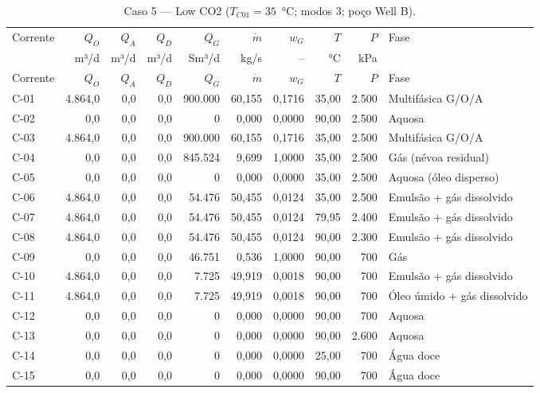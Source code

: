 \documentclass[11pt,a4paper]{article}
\numberwithin{equation}{section}
\numberwithin{table}{section}
\numberwithin{figure}{section}
\begin{document}
{\footnotesize\setlength{\tabcolsep}{3pt}\begin{longtable}{lrrrrrrrrL{2.5cm}}
\caption{Caso 5 --- Low CO2 ($T_{C01}=35$~°C; modos 3; poço Well B).}\\\toprule
Corrente & $Q_O$ & $Q_A$ & $Q_D$ & $Q_G$ & $\dot m$ & $w_G$ & $T$ & $P$ & Fase\\ & m³/d & m³/d & m³/d & Sm³/d & kg/s & -- & °C & kPa & \\\midrule\endfirsthead
\toprule Corrente & $Q_O$ & $Q_A$ & $Q_D$ & $Q_G$ & $\dot m$ & $w_G$ & $T$ & $P$ & Fase\\\midrule\endhead
C-01 & 4.864,0 & 0,0 & 0,0 & 900.000 & 60,155 & 0,1716 & 35,00 & 2.500 & {\scriptsize Multifásica G/O/A}\\
C-02 & 0,0 & 0,0 & 0,0 & 0 & 0,000 & 0,0000 & 90,00 & 2.500 & {\scriptsize Aquosa}\\
C-03 & 4.864,0 & 0,0 & 0,0 & 900.000 & 60,155 & 0,1716 & 35,00 & 2.500 & {\scriptsize Multifásica G/O/A}\\
C-04 & 0,0 & 0,0 & 0,0 & 845.524 & 9,699 & 1,0000 & 35,00 & 2.500 & {\scriptsize Gás (névoa residual)}\\
C-05 & 0,0 & 0,0 & 0,0 & 0 & 0,000 & 0,0000 & 35,00 & 2.500 & {\scriptsize Aquosa (óleo disperso)}\\
C-06 & 4.864,0 & 0,0 & 0,0 & 54.476 & 50,455 & 0,0124 & 35,00 & 2.500 & {\scriptsize Emulsão + gás dissolvido}\\
C-07 & 4.864,0 & 0,0 & 0,0 & 54.476 & 50,455 & 0,0124 & 79,95 & 2.400 & {\scriptsize Emulsão + gás dissolvido}\\
C-08 & 4.864,0 & 0,0 & 0,0 & 54.476 & 50,455 & 0,0124 & 90,00 & 2.300 & {\scriptsize Emulsão + gás dissolvido}\\
C-09 & 0,0 & 0,0 & 0,0 & 46.751 & 0,536 & 1,0000 & 90,00 & 700 & {\scriptsize Gás}\\
C-10 & 4.864,0 & 0,0 & 0,0 & 7.725 & 49,919 & 0,0018 & 90,00 & 700 & {\scriptsize Emulsão + gás dissolvido}\\
C-11 & 4.864,0 & 0,0 & 0,0 & 7.725 & 49,919 & 0,0018 & 90,00 & 700 & {\scriptsize Óleo úmido + gás dissolvido}\\
C-12 & 0,0 & 0,0 & 0,0 & 0 & 0,000 & 0,0000 & 90,00 & 700 & {\scriptsize Aquosa}\\
C-13 & 0,0 & 0,0 & 0,0 & 0 & 0,000 & 0,0000 & 90,00 & 2.600 & {\scriptsize Aquosa}\\
C-14 & 0,0 & 0,0 & 0,0 & 0 & 0,000 & 0,0000 & 25,00 & 700 & {\scriptsize Água doce}\\
C-15 & 0,0 & 0,0 & 0,0 & 0 & 0,000 & 0,0000 & 90,00 & 700 & {\scriptsize Água doce}\\

\end{longtable}}
\end{document}
